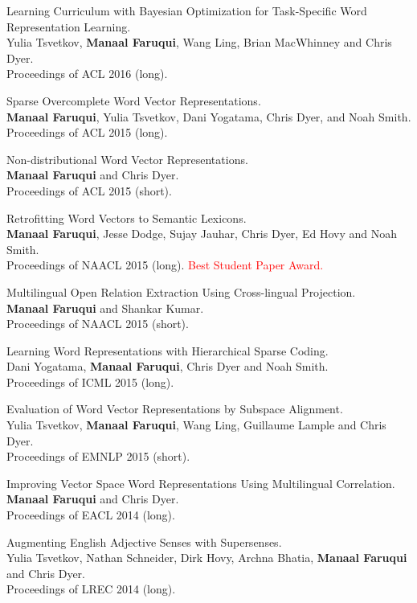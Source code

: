 \documentclass[margin,line]{res}
\begin{document}
\begin{resume}
Learning Curriculum with Bayesian Optimization for Task-Specific Word Representation Learning.\\
Yulia Tsvetkov, \textbf{Manaal Faruqui}, Wang Ling, Brian MacWhinney and Chris Dyer.\\
Proceedings of ACL 2016 (long).

Sparse Overcomplete Word Vector Representations.\\
\textbf{Manaal Faruqui}, Yulia Tsvetkov, Dani Yogatama, Chris Dyer, and Noah Smith.\\
Proceedings of ACL 2015 (long).

Non-distributional Word Vector Representations.\\
\textbf{Manaal Faruqui} and Chris Dyer.\\
Proceedings of ACL 2015 (short).

Retrofitting Word Vectors to Semantic Lexicons.\\
\textbf{Manaal Faruqui}, Jesse Dodge, Sujay Jauhar, Chris Dyer, Ed Hovy and Noah Smith.\\
Proceedings of NAACL 2015 (long). \textcolor{red}{Best Student Paper Award.}

Multilingual Open Relation Extraction Using Cross-lingual Projection.\\
\textbf{Manaal Faruqui} and Shankar Kumar.\\
Proceedings of NAACL 2015 (short).

Learning Word Representations with Hierarchical Sparse Coding.\\
Dani Yogatama, \textbf{Manaal Faruqui}, Chris Dyer and Noah Smith.\\
Proceedings of ICML 2015 (long).

Evaluation of Word Vector Representations by Subspace Alignment.\\
Yulia Tsvetkov, \textbf{Manaal Faruqui}, Wang Ling, Guillaume Lample and Chris Dyer.\\
Proceedings of EMNLP 2015 (short).

Improving Vector Space Word Representations Using Multilingual Correlation.\\
\textbf{Manaal Faruqui} and Chris Dyer.\\
Proceedings of EACL 2014 (long).

Augmenting English Adjective Senses with Supersenses.\\
Yulia Tsvetkov, Nathan Schneider, Dirk Hovy, Archna Bhatia, \textbf{Manaal Faruqui} and Chris Dyer.\\
Proceedings of LREC 2014 (long).


\end{resume}
\end{document}
